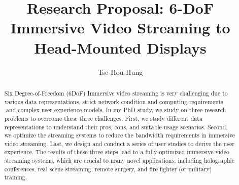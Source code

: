\documentclass[sigconf]{acmart}
\begin{document}
%
\title{Research Proposal: 6-DoF Immersive Video Streaming to Head-Mounted Displays}

%
\author{Tse-Hou Hung}

\begin{abstract}
  Six Degree-of-Freedom (6DoF) Immersive video streaming is very challenging due to various data representations, 
  strict network condition and computing requirements ,and complex user experience models. In my PhD 
  study, we study on three research problems to overcome these three challenges.
  First, we study different data representations to understand their pros, cons, and suitable 
  usage scenarios. Second, we optimize the streaming systems to reduce the bandwidth requirements in immersive video streaming.
  Last, we design and conduct a series of user studies to derive the user experience.
  The results of these three steps lead to a fully-optimized immersive video streaming systems,
  which are crucial to many novel applications, including holographic conferences, 
  real scene streaming, remote surgery, and fire fighter (or military) training.
\end{abstract}
%
\maketitle







\end{document}
